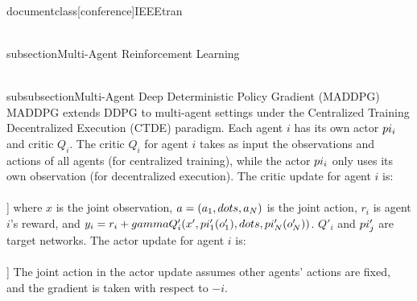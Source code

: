 \\documentclass[conference]{IEEEtran}
\begin{document}
\\subsection{Multi-Agent Reinforcement Learning}

\\subsubsection{Multi-Agent Deep Deterministic Policy Gradient (MADDPG)}
MADDPG extends DDPG to multi-agent settings under the Centralized Training Decentralized Execution (CTDE) paradigm. Each agent $i$ has its own actor $\\pi_i$ and critic $Q_i$. The critic $Q_i$ for agent $i$ takes as input the observations and actions of all agents (for centralized training), while the actor $\\pi_i$ only uses its own observation (for decentralized execution).
The critic update for agent $i$ is:
\\[
L(Q_i) = \\mathbb{E}_{x,a,r,x' \\sim \\mathcal{R}} \\left[ \\left( Q_i(x, a_1, \\dots, a_N) - y_i \\right)^2 \\right]
\\]
where $x$ is the joint observation, $a = (a_1, \\dots, a_N)$ is the joint action, $r_i$ is agent $i$'s reward, and $y_i = r_i + \\gamma Q'_i(x', \\pi'_1(o'_1), \\dots, \\pi'_N(o'_N))$. $Q'_i$ and $\\pi'_j$ are target networks.
The actor update for agent $i$ is:
\\[
J(\\pi_i) = \\mathbb{E}_{x,a \\sim \\mathcal{R}} \\left[ Q_i(x, a_1, \\dots, \\pi_i(o_i), \\dots, a_N) \\right]
\\]
The joint action in the actor update assumes other agents' actions are fixed, and the gradient is taken with respect to $-i$.
\end{document}
